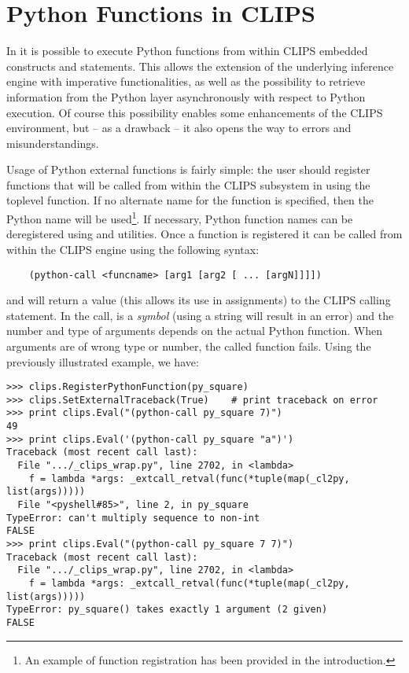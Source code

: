 \section{Python Functions in CLIPS\label{pyclips-unotes-pyfuncs}}

In \pyclips{} it is possible to execute Python functions from within
CLIPS embedded constructs and statements. This allows the extension of
the underlying inference engine with imperative functionalities, as well
as the possibility to retrieve information from the Python layer
asynchronously with respect to Python execution. Of course this
possibility enables some enhancements of the CLIPS environment, but
-- as a drawback -- it also opens the way to errors and misunderstandings.

Usage of Python external functions is fairly simple: the user should
register functions that will be called from within the CLIPS subsystem
in \pyclips{} using the  toplevel
function. If no alternate name for the function is specified, then the
Python name will be used\footnote{An example of function registration
has been provided in the introduction.}. If necessary, Python function
names can be deregistered using  and
 utilities. Once a function is registered
it can be called from within the CLIPS engine using the following syntax:

\begin{verbatim}
    (python-call <funcname> [arg1 [arg2 [ ... [argN]]]])
\end{verbatim}

and will return a value (this allows its use in assignments) to the CLIPS
calling statement. In the call,  is a \emph{symbol}
(using a string will result in an error) and the number and type of
arguments depends on the actual Python function. When arguments are of
wrong type or number, the called function fails. Using the previously
illustrated  example, we have:

\begin{verbatim}
>>> clips.RegisterPythonFunction(py_square)
>>> clips.SetExternalTraceback(True)	# print traceback on error
>>> print clips.Eval("(python-call py_square 7)")
49
>>> print clips.Eval('(python-call py_square "a")')
Traceback (most recent call last):
  File ".../_clips_wrap.py", line 2702, in <lambda>
    f = lambda *args: _extcall_retval(func(*tuple(map(_cl2py, list(args)))))
  File "<pyshell#85>", line 2, in py_square
TypeError: can't multiply sequence to non-int
FALSE
>>> print clips.Eval("(python-call py_square 7 7)")
Traceback (most recent call last):
  File ".../_clips_wrap.py", line 2702, in <lambda>
    f = lambda *args: _extcall_retval(func(*tuple(map(_cl2py, list(args)))))
TypeError: py_square() takes exactly 1 argument (2 given)
FALSE
\end{verbatim}

